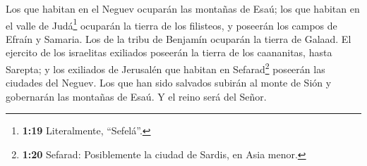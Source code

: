 Los que habitan en el Neguev ocuparán las montañas de
Esaú; los que habitan en el valle de Judá\footnote{\textbf{1:19}
  Literalmente, ``Sefelá''.} ocuparán la tierra de los filisteos, y
poseerán los campos de Efraín y Samaria. Los de la tribu de Benjamín
ocuparán la tierra de Galaad.  El ejercito de los
israelitas exiliados poseerán la tierra de los caananitas, hasta
Sarepta; y los exiliados de Jerusalén que habitan en Sefarad\footnote{\textbf{1:20}
  Sefarad: Posiblemente la ciudad de Sardis, en Asia menor.} poseerán
las ciudades del Neguev.  Los que han sido salvados
subirán al monte de Sión y gobernarán las montañas de Esaú. Y el reino
será del Señor.
